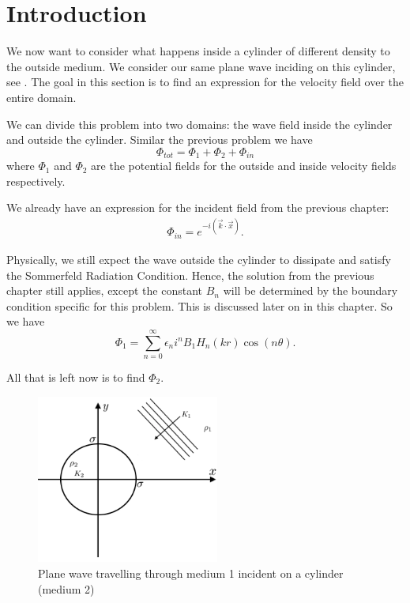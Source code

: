 %
\section{Introduction}
We now want to consider what happens inside a cylinder of different density to the outside medium. We consider our same plane wave inciding on this cylinder, see . The goal in this section is to find an expression for the velocity field over the entire domain. \par

We can divide this problem into two domains: the wave field inside the cylinder and outside the cylinder. Similar the previous problem we have
\begin{equation}
  \Phi_{tot} = \Phi_{1} + \Phi_{2} + \Phi_{in}
\end{equation}
where $\Phi_{1}$ and $\Phi_{2}$ are the potential fields for the outside and inside velocity fields respectively.

We already have an expression for the incident field from the previous chapter:
\begin{gather}
  \Phi_{in} = e^{- i(\vec{k} \cdot \vec{x})}.
\end{gather}

Physically, we still expect the wave outside the cylinder to dissipate and satisfy the Sommerfeld Radiation Condition. Hence, the solution from the previous chapter still applies, except the constant $B_n$ will be determined by the boundary condition specific for this problem. This is discussed later on in this chapter. So we have
\begin{equation}
  \Phi_1 = \sum^\infty_{n=0} \epsilon_n i^n B_1 H_n(kr) \cos(n\theta).
\end{equation}

All that is left now is to find $\Phi_2$.

\begin{figure} \centering
  \includegraphics[width=6cm]{../figures/prob2_sketch.png}
  \caption{Plane wave travelling through medium 1 incident on a cylinder (medium 2)}\label{fig:problem_2}
\end{figure}

